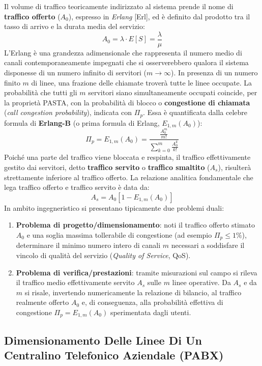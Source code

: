 \documentclass[11pt, a4paper]{article}
\begin{document}
Il volume di traffico teoricamente indirizzato al sistema prende il nome di \textbf{traffico offerto} ($A_0$), espresso in \emph{Erlang} [Erl], ed è definito dal prodotto tra il tasso di arrivo e la durata media del servizio:
\[
A_0 = \lambda \cdot E[S] = \frac{\lambda}{\mu}
\]
L'Erlang è una grandezza adimensionale che rappresenta il numero medio di canali contemporaneamente impegnati che si osserverebbero qualora il sistema disponesse di un numero infinito di servitori ($m \to \infty$). In presenza di un numero finito $m$ di linee, una frazione delle chiamate troverà tutte le linee occupate. La probabilità che tutti gli $m$ servitori siano simultaneamente occupati coincide, per la proprietà PASTA, con la probabilità di blocco o \textbf{congestione di chiamata} (\emph{call congestion probability}), indicata con $\Pi_p$. Essa è quantificata dalla celebre formula di \textbf{Erlang-B} (o prima formula di Erlang, $E_{1,m}(A_0)$):
\[
\boxed{\Pi_p = E_{1,m}(A_0) = \frac{\displaystyle\frac{A_0^m}{m!}}{\displaystyle\sum_{k=0}^m \frac{A_0^k}{k!}}}
\]
Poiché una parte del traffico viene bloccata e respinta, il traffico effettivamente gestito dai servitori, detto \textbf{traffico servito} o \textbf{traffico smaltito} ($A_s$), risulterà strettamente inferiore al traffico offerto. La relazione analitica fondamentale che lega traffico offerto e traffico servito è data da:
\[
\boxed{A_s = A_0 \left[ 1 - E_{1,m}(A_0) \right]}
\]
In ambito ingegneristico si presentano tipicamente due problemi duali:
\begin{enumerate}[noitemsep]
    \item \textbf{Problema di progetto/dimensionamento}: noti il traffico offerto stimato $A_0$ e una soglia massima tollerabile di congestione (ad esempio $\Pi_p \le 1\%$), determinare il minimo numero intero di canali $m$ necessari a soddisfare il vincolo di qualità del servizio (\emph{Quality of Service}, QoS).
    \item \textbf{Problema di verifica/prestazioni}: tramite misurazioni sul campo si rileva il traffico medio effettivamente servito $A_s$ sulle $m$ linee operative. Da $A_s$ e da $m$ si risale, invertendo numericamente la relazione di bilancio, al traffico realmente offerto $A_0$ e, di conseguenza, alla probabilità effettiva di congestione $\Pi_p = E_{1,m}(A_0)$ sperimentata dagli utenti.
\end{enumerate}

\subsection{Dimensionamento Delle Linee Di Un Centralino Telefonico Aziendale (PABX)}
\end{document}
